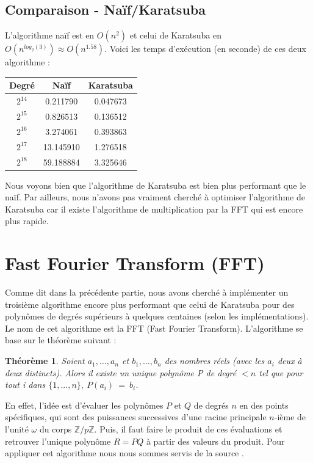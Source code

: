 \documentclass[12pt, a4paper]{article}
\begin{document}
\subsection{Comparaison - Naïf/Karatsuba}
L'algorithme naïf est en $O(n^2)$ et celui de Karatsuba en $O(n^{log_2(3)}) \approx O(n^{1.58})$. Voici les temps d'exécution (en seconde) de ces deux algorithme :

\begin{center}
\begin{tabular}{||c c c||}
\hline
Degré & Naïf & Karatsuba \\
\hline\hline
$2^{14}$ & 0.211790 & 0.047673 \\
\hline
$2^{15}$ & 0.826513 & 0.136512 \\
\hline
$2^{16}$ & 3.274061 & 0.393863 \\
\hline
$2^{17}$ & 13.145910 & 1.276518 \\
\hline
$2^{18}$ & 59.188884 & 3.325646 \\
\hline
\end{tabular}
\end{center}

Nous voyons bien que l'algorithme de Karatsuba est bien plus performant que le naïf. Par ailleurs, nous n'avons pas vraiment cherché à optimiser l'algorithme de Karatsuba car il existe l'algorithme de multiplication par la FFT qui est encore plus rapide.

\section{Fast Fourier Transform (FFT)}

Comme dit dans la précédente partie, nous avons cherché à implémenter un troisième algorithme encore plus performant que celui de Karatsuba pour des polynômes de degrés supérieurs à quelques centaines (selon les implémentations). Le nom de cet algorithme est la FFT (Fast Fourier Transform). L'algorithme se base sur le théorème suivant :

\newtheorem{Thm1}{Théorème}
\begin{Thm1}
Soient $a_1,\dots,a_n$ et $b_1,\dots,b_n$ des nombres réels (avec les $a_i$ deux à deux distincts). Alors il existe un unique polynôme P de degré $< n$ tel que pour tout i dans $\{1,..., n\},\ P(a_i)\ =\ b_i$.
\end{Thm1}

En effet, l’idée est d’évaluer les polynômes $P$ et $Q$ de degrés $n$ en des points spécifiques, qui sont des puissances successives d'une racine principale $n$-ième de l'unité $\omega$ du corps $\mathbb{Z}/p\mathbb{Z}$. Puis, il faut faire le produit de ces évaluations et retrouver l’unique polynôme $R=PQ$ à partir des valeurs du produit. Pour appliquer cet algorithme nous nous sommes servis de la source \cite{AECF}. \\
 
\end{document}

